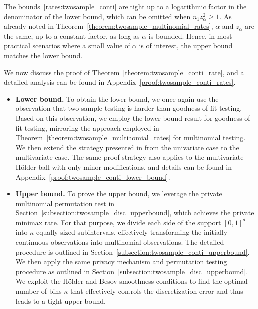 \documentclass[twoside,11pt]{article}
\newcommand{\dimDensity}{d} %
\newcommand{\privacyParameter}{\alpha} %
\newcommand{\binNum}{\kappa}           %
\begin{document}
The bounds~\eqref{rates:twosample_conti} are tight up to a logarithmic factor in the denominator of the lower bound,
which can be omitted when $n_1 z_\privacyParameter^2 \geq 1$.
As already noted in Theorem~\ref{theorem:twosample_multinomial_rates},
$\privacyParameter$ and $z_\privacyParameter$ are the same, up to a constant factor, as long as $\alpha$ is bounded. Hence, in most practical scenarios where a small value of $\alpha$ is of interest, the upper bound matches the lower bound. 


We now discuss the proof of Theorem~\ref{theorem:twosample_conti_rate}, and a detailed analysis can be found in Appendix~\ref{proof:twosample_conti_rates}.
\begin{itemize}
	\item \textbf{Lower bound.} 
	To obtain the lower bound, we once again use the observation that two-sample testing is harder than goodness-of-fit testing. Based on this observation, we employ the lower bound result for goodness-of-fit testing, mirroring the approach employed in Theorem~\ref{theorem:twosample_multinomial_rates} for multinomial testing. We then extend the strategy presented in \citet{Lam-Weil2021MinimaxConstraint} from the univariate case to the multivariate case. The same proof strategy also applies to the multivariate H\"{o}lder ball with only minor modifications, and details can be found in Appendix~\ref{proof:twosample_conti_lower_bound}.
	\item \textbf{Upper bound.} To prove the upper bound, we leverage the private multinomial permutation test in Section~\ref{subsection:twosample_disc_upperbound}, which achieves the private minimax rate.
	For that purpose, we divide each side of the support $[0,1]^\dimDensity$ into $\binNum$ equally-sized subintervals, effectively transforming the initially continuous observations into multinomial observations. The detailed procedure is outlined in Section~\ref{subsection:twosample_conti_upperbound}. We then apply the same privacy mechanism and permutation testing procedure as outlined in Section~\ref{subsection:twosample_disc_upperbound}.
	We exploit the H\"{o}lder and Besov smoothness conditions to find the optimal number of bins $\binNum$ that effectively controls the discretization error and thus leads to a tight upper bound.
\end{itemize}
\end{document}
